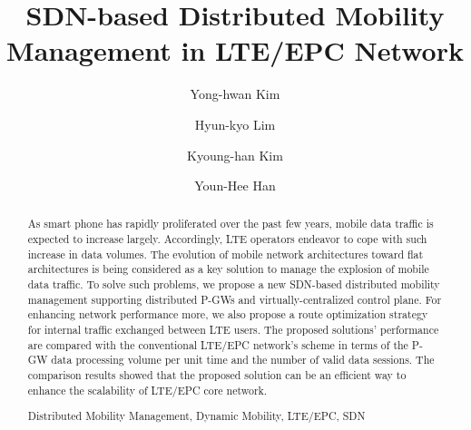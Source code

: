 \documentclass[runningheads,a4paper]{llncs}
\newcommand{\keywords}[1]{\par\addvspace\baselineskip
\noindent\keywordname\enspace\ignorespaces#1}
\begin{document}
\mainmatter  %

\title{SDN-based Distributed Mobility Management in LTE/EPC Network}


%
%

\author{Yong-hwan Kim\inst{}
\and Hyun-kyo Lim\inst{}
\and Kyoung-han Kim\inst{}
\and Youn-Hee Han\inst{}}
%


%
%

\maketitle


\begin{abstract}
As smart phone has rapidly proliferated over the past few years, mobile data traffic is expected to increase largely. Accordingly, LTE operators endeavor to cope with such increase in data volumes. The evolution of mobile network architectures toward flat architectures is being considered as a key solution to manage the explosion of mobile data traffic. To solve such problems, we propose a new SDN-based distributed mobility management supporting distributed P-GWs and virtually-centralized control plane. For enhancing network performance more, we also propose a route optimization strategy for internal traffic exchanged between LTE users. The proposed solutions' performance are compared with the conventional LTE/EPC network's scheme in terms of the P-GW data processing volume per unit time and the number of valid data sessions. The comparison results showed that the proposed solution can be an efficient way to enhance the scalability of LTE/EPC core network.

\keywords{Distributed Mobility Management, Dynamic Mobility, LTE/EPC, SDN}
\end{abstract}
\end{document}
